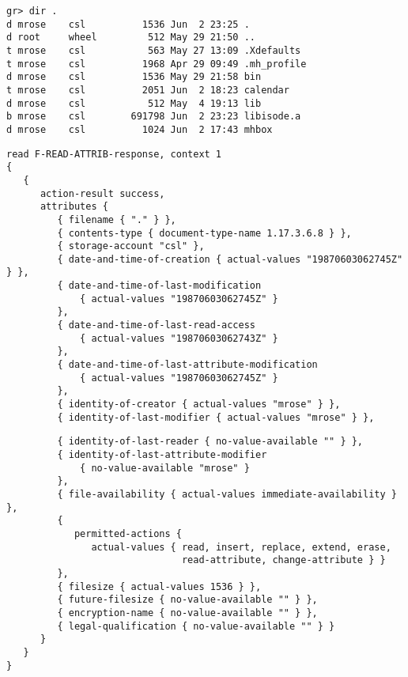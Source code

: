 \begin{bwslide}
\small

\begin{verbatim}
gr> dir .
d mrose    csl          1536 Jun  2 23:25 .
d root     wheel         512 May 29 21:50 ..
t mrose    csl           563 May 27 13:09 .Xdefaults
t mrose    csl          1968 Apr 29 09:49 .mh_profile
d mrose    csl          1536 May 29 21:58 bin
t mrose    csl          2051 Jun  2 18:23 calendar
d mrose    csl           512 May  4 19:13 lib
b mrose    csl        691798 Jun  2 23:23 libisode.a
d mrose    csl          1024 Jun  2 17:43 mhbox
\end{verbatim}
\end{bwslide}


\begin{bwslide}
\small

\begin{verbatim}
read F-READ-ATTRIB-response, context 1
{
   {
      action-result success,
      attributes {
         { filename { "." } },
         { contents-type { document-type-name 1.17.3.6.8 } },
         { storage-account "csl" },
         { date-and-time-of-creation { actual-values "19870603062745Z" } },
         { date-and-time-of-last-modification
             { actual-values "19870603062745Z" }
         },
         { date-and-time-of-last-read-access
             { actual-values "19870603062743Z" }
         },
         { date-and-time-of-last-attribute-modification
             { actual-values "19870603062745Z" }
         },
         { identity-of-creator { actual-values "mrose" } },
         { identity-of-last-modifier { actual-values "mrose" } },
\end{verbatim}
\end{bwslide}


\begin{bwslide}\small
\begin{verbatim}
         { identity-of-last-reader { no-value-available "" } },
         { identity-of-last-attribute-modifier
             { no-value-available "mrose" }
         },
         { file-availability { actual-values immediate-availability } },
         {
            permitted-actions {
               actual-values { read, insert, replace, extend, erase,
                               read-attribute, change-attribute } }
         },
         { filesize { actual-values 1536 } },
         { future-filesize { no-value-available "" } },
         { encryption-name { no-value-available "" } },
         { legal-qualification { no-value-available "" } }
      }
   }
}
\end{verbatim}
\end{bwslide}


